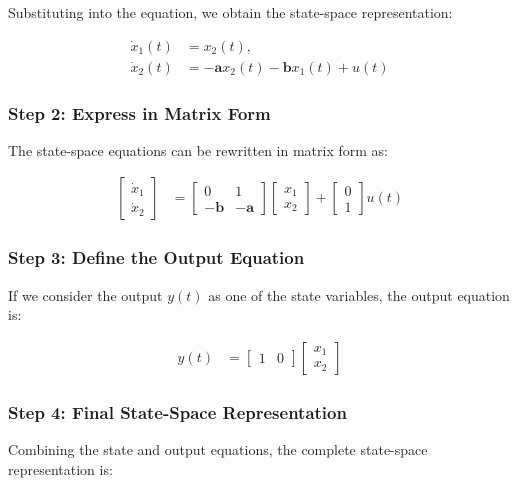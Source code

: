 \documentclass{article}
\begin{document}
Substituting into the equation, we obtain the state-space representation:

\begin{align*}
      \dot{x}_1(t) &= x_2(t), \\
      \dot{x}_2(t) &= -\mathbf{a} x_2(t) - \mathbf{b} x_1(t) + u(t)
\end{align*}

\subsubsection{Step 2: Express in Matrix Form}
The state-space equations can be rewritten in matrix form as:

\begin{align*}
    \begin{bmatrix} \dot{x}_1 \\ \dot{x}_2 \end{bmatrix} &= 
    \begin{bmatrix} 0 & 1 \\ -\mathbf{b} & -\mathbf{a} \end{bmatrix} 
    \begin{bmatrix} x_1 \\ x_2 \end{bmatrix} + 
    \begin{bmatrix} 0 \\ 1 \end{bmatrix} u(t)
\end{align*}

\subsubsection{Step 3: Define the Output Equation}
If we consider the output \( y(t) \) as one of the state variables, the output equation is:

\begin{align*}
    y(t) &= \begin{bmatrix} 1 & 0 \end{bmatrix} 
    \begin{bmatrix} x_1 \\ x_2 \end{bmatrix}
\end{align*}

\subsubsection{Step 4: Final State-Space Representation}
Combining the state and output equations, the complete state-space representation is:
\end{document}
